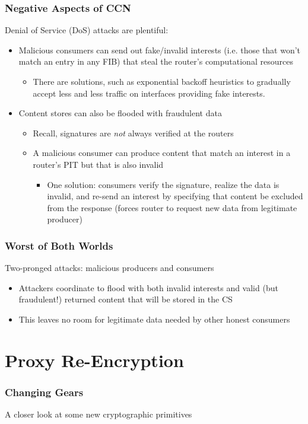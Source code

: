 \documentclass[handout]{beamer}
\begin{document}
\begin{frame}
	\frametitle{Negative Aspects of CCN}
	Denial of Service (DoS) attacks are plentiful:
	\begin{itemize}
		\item Malicious consumers can send out fake/invalid interests (i.e. those that won't match an entry in any FIB) that steal the router's computational resources
		\begin{itemize}
			\item There are solutions, such as exponential backoff heuristics to gradually accept less and less traffic on interfaces providing fake interests.
		\end{itemize}
		\item Content stores can also be flooded with fraudulent data
		\begin{itemize}
			\item Recall, signatures are \emph{not} always verified at the routers
			\item A malicious consumer can produce content that match an interest in a router's PIT but that is also invalid
			\begin{itemize}
				\item One solution: consumers verify the signature, realize the data is invalid, and re-send an interest by specifying that content be excluded from the response (forces router to request new data from legitimate producer)
			\end{itemize}
		\end{itemize}
	\end{itemize}
\end{frame}

\begin{frame}
	\frametitle{Worst of Both Worlds}
	Two-pronged attacks: malicious producers and consumers
	\begin{itemize}
		\item Attackers coordinate to flood with both invalid interests and valid (but fraudulent!) returned content that will be stored in the CS
		\item This leaves no room for legitimate data needed by other honest consumers
	\end{itemize}
\end{frame}


\section{Proxy Re-Encryption}
\begin{frame}
	\frametitle{Changing Gears}
	\begin{center}
	A closer look at some new cryptographic primitives
	\end{center}
\end{frame}
\end{document}
